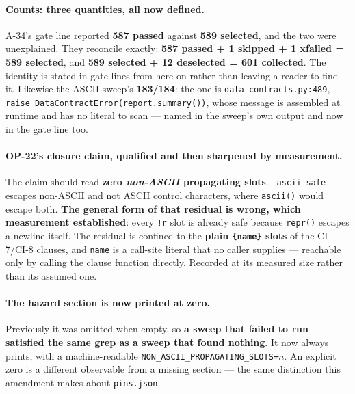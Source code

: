\documentclass[
  10pt,
]{article}
\begin{document}
\paragraph{Counts: three quantities, all now defined.}
A-34's gate line reported \textbf{587 passed} against \textbf{589 selected}, and the two were unexplained. They reconcile exactly: \textbf{587 passed + 1 skipped + 1 xfailed = 589 selected}, and \textbf{589 selected + 12 deselected = 601 collected}. The identity is stated in gate lines from here on rather than leaving a reader to find it. Likewise the ASCII sweep's \textbf{183/184}: the one is \texttt{data\_contracts.py:489}, \texttt{raise DataContractError(report.summary())}, whose message is assembled at runtime and has no literal to scan --- named in the sweep's own output and now in the gate line too.

\paragraph{OP-22's closure claim, qualified and then sharpened by measurement.}
The claim should read \textbf{zero \emph{non-ASCII} propagating slots}. \texttt{\_ascii\_safe} escapes non-ASCII and not ASCII control characters, where \texttt{ascii()} would escape both. \textbf{The general form of that residual is wrong, which measurement established}: every \texttt{!r} slot is already safe because \texttt{repr()} escapes a newline itself. The residual is confined to the \textbf{plain \texttt{\{name\}} slots} of the CI-7/CI-8 clauses, and \texttt{name} is a call-site literal that no caller supplies --- reachable only by calling the clause function directly. Recorded at its measured size rather than its assumed one.

\paragraph{The hazard section is now printed at zero.}
Previously it was omitted when empty, so \textbf{a sweep that failed to run satisfied the same grep as a sweep that found nothing}. It now always prints, with a machine-readable \texttt{NON\_ASCII\_PROPAGATING\_SLOTS=$n$}. An explicit zero is a different observable from a missing section --- the same distinction this amendment makes about \texttt{pins.json}.
\end{document}
